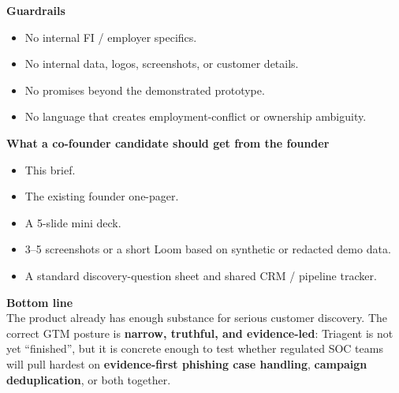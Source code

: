 \documentclass[10pt,a4paper]{article}
\begin{document}
\noindent\textbf{Guardrails}
\begin{itemize}
  \item No internal FI / employer specifics.
  \item No internal data, logos, screenshots, or customer details.
  \item No promises beyond the demonstrated prototype.
  \item No language that creates employment-conflict or ownership ambiguity.
\end{itemize}

\noindent\textbf{What a co-founder candidate should get from the founder}
\begin{itemize}
  \item This brief.
  \item The existing founder one-pager.
  \item A 5-slide mini deck.
  \item 3--5 screenshots or a short Loom based on synthetic or redacted demo data.
  \item A standard discovery-question sheet and shared CRM / pipeline tracker.
\end{itemize}

\noindent\textbf{Bottom line}\\
The product already has enough substance for serious customer discovery. The correct GTM posture is \textbf{narrow, truthful, and evidence-led}: Triagent is not yet ``finished'', but it is concrete enough to test whether regulated SOC teams will pull hardest on \textbf{evidence-first phishing case handling}, \textbf{campaign deduplication}, or both together.
\end{document}
